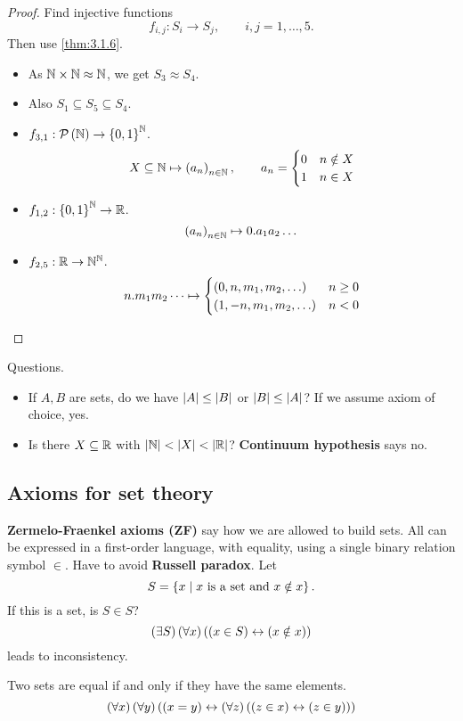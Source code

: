 \begin{proof}
Find injective functions
$$ f_{i, j} : S_i \to S_j, \qquad i, j = 1, \dots, 5. $$
Then use \ref{thm:3.1.6}.
\begin{itemize}
\item As $ \mathbb{N} \times \mathbb{N} \approx \mathbb{N} $, we get $ S_3 \approx S_4 $.
\item Also $ S_1 \subseteq S_5 \subseteq S_4 $.
\item $ f_{3, 1} : \mathcal{P}\left( \mathbb{N} \right) \to \left\{ 0, 1 \right\}^{\mathbb{N}} $.
$$ X \subseteq \mathbb{N} \mapsto \left( a_n \right)_{n \in \mathbb{N}}, \qquad a_n = \begin{cases}
0 & n \notin X \\
1 & n \in X
\end{cases} $$
\item $ f_{1, 2} : \left\{ 0, 1 \right\}^{\mathbb{N}} \to \mathbb{R} $.
$$ \left( a_n \right)_{n \in \mathbb{N}} \mapsto 0 . a_1a_2 \dots $$
\item $ f_{2, 5} : \mathbb{R} \to \mathbb{N}^{\mathbb{N}} $.
$$ n . m_1m_2 \dots \mapsto \begin{cases}
\rb{0, n, m_1, m_2, \dots} & n \ge 0 \\
\rb{1, -n, m_1, m_2, \dots} & n < 0
\end{cases} $$
\end{itemize}
\end{proof}

\pagebreak

Questions.
\begin{itemize}
\item If $ A, B $ are sets, do we have $ \left\lvert A \right\rvert \le \left\lvert B \right\rvert $ or $ \left\lvert B \right\rvert \le \left\lvert A \right\rvert $? If we assume axiom of choice, yes.
\item Is there $ X \subseteq \mathbb{R} $ with $ \left\lvert \mathbb{N} \right\rvert < \left\lvert X \right\rvert < \left\lvert \mathbb{R} \right\rvert $? \textbf{Continuum hypothesis} says no.
\end{itemize}

\subsection{Axioms for set theory}

\textbf{Zermelo-Fraenkel axioms (ZF)} say how we are allowed to build sets. All can be expressed in a first-order language, with equality, using a single binary relation symbol $ \in $. Have to avoid \textbf{Russell paradox}. Let
$$ S = \left\{ x \mid x \ \text{is a set and} \ x \notin x \right\}. $$
If this is a set, is $ S \in S $?
$$ \left( \exists S \right)\left( \forall x \right)\left( \left( x \in S \right) \leftrightarrow \left( x \notin x \right) \right) $$
leads to inconsistency.

\begin{axiom}
Two sets are equal if and only if they have the same elements.
$$ \left( \forall x \right)\left( \forall y \right)\left( \left( x = y \right) \leftrightarrow \left( \forall z \right)\left( \left( z \in x \right) \leftrightarrow \left( z \in y \right) \right) \right) $$
\end{axiom}

